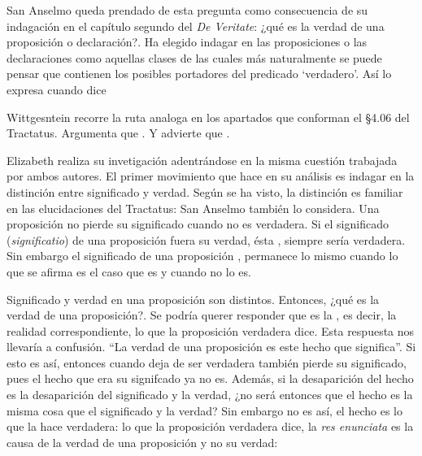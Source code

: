 San Anselmo queda prendado de esta pregunta como consecuencia de su indagación
en el capítulo segundo del \emph{De Veritate}: ¿qué es la verdad de una
proposición o declaración?. Ha elegido indagar en las proposiciones o las
declaraciones como aquellas clases de las cuales más naturalmente se puede
pensar que contienen los posibles portadores del predicado `verdadero'. Así lo
expresa cuando dice \autocite{De Veritate c. 2}

Wittgesntein recorre la ruta analoga en los apartados que conforman el \S4.06
del Tractatus. Argumenta que \autocite[\S4.06]{wittgenstein1922tractatus}. Y advierte que
\autocite[\S4.061]{wittgenstein1922tractatus}.

Elizabeth realiza su invetigación adentrándose en la misma cuestión trabajada
por ambos autores. El primer movimiento que hace en su análisis es indagar en la
distinción entre significado y verdad. Según se ha visto, la distinción es
familiar en las elucidaciones del Tractatus: 
\autocite[\S~4.061]{wittgenstein1922tractatus} San Anselmo también lo considera.
Una proposición no pierde su significado cuando no es verdadera. Si el
significado (\emph{significatio}) de una proposición fuera su verdad, ésta
, siempre sería verdadera. Sin embargo el
significado de una proposición , permanece lo mismo cuando lo que se afirma es el
caso que es y cuando no lo es.

Significado y verdad en una proposición son distintos. Entonces, ¿qué es la
verdad de una proposición?. Se podría querer responder que es la
, es decir, la realidad correspondiente, lo que
la proposición verdadera dice. Esta respuesta nos llevaría a confusión. ``La
verdad de una proposición es este hecho que significa''. Si esto es así,
entonces cuando deja de ser verdadera también pierde su significado, pues el
hecho que era su signifcado ya no es. Además, si la desaparición del hecho es la
desaparición del significado y la verdad, ¿no será entonces que el hecho es la
misma cosa que el significado y la verdad? Sin embargo no es así, el hecho es lo
que la hace verdadera: lo que la proposición verdadera dice, la \emph{res
  enunciata} es la causa de la verdad de una proposición y no su verdad:

